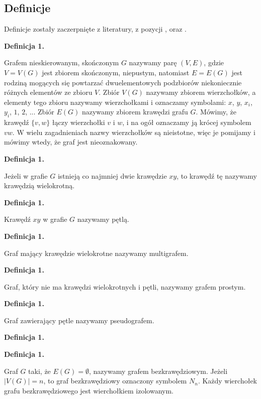 \subsection{Definicje}
Definicje zostały zaczerpnięte z literatury, z pozycji \cite{Wloch2008}, \cite{Wilson2012} oraz \cite{Wojciechwoski2013}.

\newcommand{\graphDefinitionIndex}{1}
\newcommand{\incrementGraphDefinitionIndex} {
    \pgfmathtruncatemacro{\graphDefinitionIndex}{\graphDefinitionIndex + 1}
}

\noindent
\textbf{Definicja \graphDefinitionIndex.}
\incrementGraphDefinitionIndex
Grafem nieskierowanym, skończonym $G$ nazywamy parę $(V,E)$, gdzie $V = V(G)$ jest zbiorem skończonym, niepustym,
natomiast $E = E(G)$ jest rodziną mogących się powtarzać dwuelementowych podzbiorów niekoniecznie różnych elementów ze zbioru $V$.
Zbiór $V(G)$ nazywamy zbiorem wierzchołków, a elementy tego zbioru nazywamy wierzchołkami i oznaczamy symbolami:
$x$, $y$, $x_i$, $y_i$, $1$, $2$, ... Zbiór $E(G)$ nazywamy zbiorem krawędzi grafu $G$.
Mówimy, że krawędź $\{v, w\}$ łączy wierzchołki $v$ i $w$, i na ogół oznaczamy ją krócej symbolem $vw$.
W wielu zagadnieniach nazwy wierzchołków są nieistotne, więc je pomijamy i mówimy wtedy, że graf jest nieoznakowany.

\noindent
\textbf{Definicja \graphDefinitionIndex.}
\incrementGraphDefinitionIndex
Jeżeli w grafie $G$ istnieją co najmniej dwie krawędzie $xy$, to krawędź tę nazywamy krawędzią wielokrotną.

\noindent
\textbf{Definicja \graphDefinitionIndex.}
\incrementGraphDefinitionIndex
Krawędź $xy$ w grafie $G$ nazywamy pętlą.

\noindent
\textbf{Definicja \graphDefinitionIndex.}
\incrementGraphDefinitionIndex
Graf mający krawędzie wielokrotne nazywamy multigrafem.

\noindent
\textbf{Definicja \graphDefinitionIndex.}
\incrementGraphDefinitionIndex
Graf, który nie ma krawędzi wielokrotnych i pętli, nazywamy grafem prostym.

\noindent
\textbf{Definicja \graphDefinitionIndex.}
\incrementGraphDefinitionIndex
Graf zawierający pętle nazywamy pseudografem.

\noindent
\textbf{Definicja \graphDefinitionIndex.}
\incrementGraphDefinitionIndex

\noindent
\textbf{Definicja \graphDefinitionIndex.}
\incrementGraphDefinitionIndex
Graf $G$ taki, że $E(G) = \emptyset$, nazywamy grafem bezkrawędziowym. Jeżeli $|V(G)| = n$, to graf bezkrawędziowy oznaczony symbolem $N_n$.
Każdy wierchołek grafu bezkrawędziowego jest wierchołkiem izolowanym.

